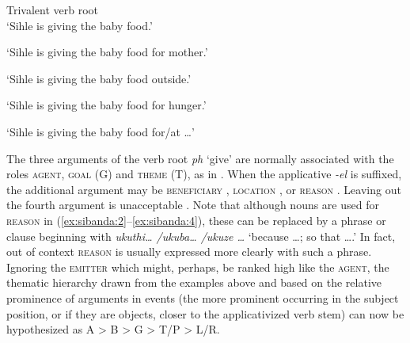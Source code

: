 \documentclass[output=paper]{langsci/langscibook}
\begin{document}
\newpage 
\ea\label{ex:sibanda:4}
\settowidth{}
{Trivalent verb root}\\
\glt ‘Sihle is giving the baby food.’

\glt ‘Sihle is giving the baby food for mother.’

\glt ‘Sihle is giving the baby food outside.’

\glt ‘Sihle is giving the baby food for hunger.’

\glt ‘Sihle is giving the baby food for/at …’
\z
\z


The three arguments of the verb root \textit{ph} ‘give’ are normally associated with the roles \textsc{agent}, \textsc{goal} (G) and \textsc{theme} (T), as in . When the applicative \textit{-el} is suffixed, the additional argument may be \textsc{beneficiary} , \textsc{location} , or \textsc{reason} . Leaving out the fourth argument is unacceptable . Note that although nouns are used for \textsc{reason} in (\ref{ex:sibanda:2}--\ref{ex:sibanda:4}), these can be replaced by a phrase or clause beginning with \textit{ukuthi… /ukuba… /ukuze …} ‘because …; so that ….’ In fact, out of context \textsc{reason} is usually expressed more clearly with such a phrase. Ignoring the \textsc{emitter} which might, perhaps, be ranked high like the \textsc{agent}, the thematic hierarchy drawn from the examples above and based on the relative prominence of arguments in events (the more prominent occurring in the subject position, or if they are objects, closer to the applicativized verb stem) can now be hypothesized as A > B > G > T/P > L/R. 
\end{document}
